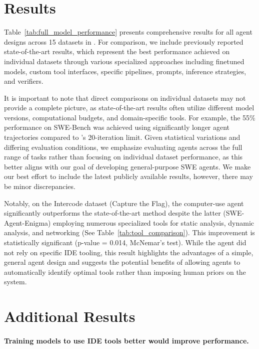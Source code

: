 \section{Results}
\label{app:results}

Table~\ref{tab:full_model_performance} presents comprehensive results for all agent designs across 15 datasets in \bench{}. For comparison, we include previously reported state-of-the-art results, which represent the best performance achieved on individual datasets through various specialized approaches including finetuned models, custom tool interfaces, specific pipelines, prompts, inference strategies, and verifiers. 

It is important to note that direct comparisons on individual datasets may not provide a complete picture, as state-of-the-art results often utilize different model versions, computational budgets, and domain-specific tools. For example, the 55\% performance on SWE-Bench was achieved using significantly longer agent trajectories compared to \ours{}'s 20-iteration limit. Given statistical variations and differing evaluation conditions, we emphasize evaluating agents across the full range of tasks rather than focusing on individual dataset performance, as this better aligns with our goal of developing general-purpose SWE agents.
We make our best effort to include the latest publicly available results, however, there may be 
minor discrepancies.

Notably, on the Intercode dataset (Capture the Flag), the computer-use agent significantly outperforms the state-of-the-art method despite the latter (SWE-Agent-Enigma) employing numerous specialized tools for static analysis, dynamic analysis, and networking (See Table~\ref{tab:tool_comparison}). This improvement is statistically significant (p-value = 0.014, McNemar's test). While the agent did not rely on specific IDE tooling, this result highlights the advantages of a simple, general agent design and suggests the potential benefits of allowing agents to automatically identify optimal tools rather than imposing human priors on the system.



\section{Additional Results}
\label{app:additional_results}



\paragraph{Training models to use IDE tools better would improve performance.}

